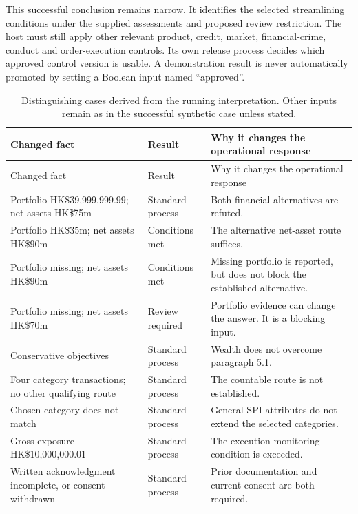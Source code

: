 This successful conclusion remains narrow. It identifies the selected
streamlining conditions under the supplied assessments and proposed review
restriction. The host must still apply other relevant product, credit, market,
financial-crime, conduct and order-execution controls. Its own release process
decides which approved control version is usable. A demonstration result is
never automatically promoted by setting a Boolean input named ``approved''.


\begingroup\small
\begin{longtable}{P{0.38\textwidth}P{0.19\textwidth}P{0.33\textwidth}}
\caption{Distinguishing cases derived from the running interpretation. Other
inputs remain as in the successful synthetic case unless stated.}\label{tab:dry-cases}\\
\toprule Changed fact & Result & Why it changes the operational response \\\midrule
\endfirsthead
\toprule Changed fact & Result & Why it changes the operational response \\\midrule
\endhead
Portfolio HK\$39,999,999.99; net assets HK\$75m & Standard process & Both financial alternatives are refuted.\\
Portfolio HK\$35m; net assets HK\$90m & Conditions met & The alternative net-asset route suffices.\\
Portfolio missing; net assets HK\$90m & Conditions met & Missing portfolio is reported, but does not block the established alternative.\\
Portfolio missing; net assets HK\$70m & Review required & Portfolio evidence can change the answer. It is a blocking input.\\
Conservative objectives & Standard process & Wealth does not overcome paragraph 5.1.\\
Four category transactions; no other qualifying route & Standard process & The countable route is not established.\\
Chosen category does not match & Standard process & General SPI attributes do not extend the selected categories.\\
Gross exposure HK\$10,000,000.01 & Standard process & The execution-monitoring condition is exceeded.\\
Written acknowledgment incomplete, or consent withdrawn & Standard process & Prior documentation and current consent are both required.\\

\end{longtable}
